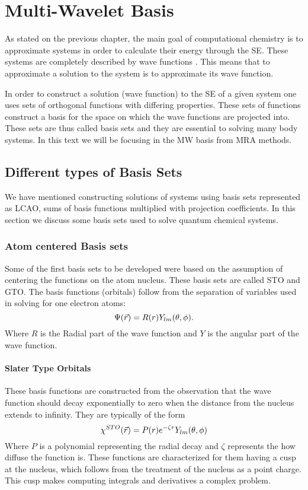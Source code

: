 \documentclass[../master_thesis.tex]{subfiles}
\begin{document}
\chapter{Multi-Wavelet Basis}
As stated on the previous chapter, the main goal of computational chemistry is
to approximate systems in order to calculate their energy through the \ac{SE}. %
These systems are completely described by wave functions \cite{Cohen:1973}.
This means that to approximate a solution to the system is to approximate its
wave function.

In order to construct a solution (wave function) to the \ac{SE} of a given
system one uses sets of orthogonal functions with differing properties. These
sets of functions construct a basis for the space on which the wave functions
are projected into. These sets are thus called basis sets \cite{Cramer:2004}
and they are essential to solving many body systems. In this text we will be
focusing in the \ac{MW} basis from \ac{MRA} methods.
\section{Different types of  Basis Sets}
We have mentioned constructing solutions of systems using basis sets represented as
\ac{LCAO}, sums of basis functions multiplied with projection coefficients.
In this section we discuss some basis sets used to solve quantum chemical systems.
\subsection{Atom centered Basis sets}
Some of the first basis sets to be developed were based on the assumption of
centering the functions on the atom nucleus. These basis sets are called \ac{STO}
and \ac{GTO}. The basis functions (orbitals) follow from the separation of variables
used in solving for one electron atoms:
\begin{equation}
  \Psi(\vec{r}) = R(r)Y_{lm}(\theta, \phi).
\end{equation}
Where $R$ is the Radial part of the wave function and $Y$ is the angular part of
the wave function.
\subsubsection{Slater Type Orbitals}
These basis functions are constructed from the observation that the wave function
should decay exponentially to zero when the distance from the nucleus extends
to infinity. They are typically of the form \cite{Jensen:2017, ESQCB1P1}
\begin{equation}
  \chi^{STO}(\vec{r}) = P(r)e^{-\zeta r}Y_{lm}(\theta, \phi)
\end{equation}
Where $P$ is a polynomial representing the radial decay and $\zeta$ represents the
how diffuse the function is. These functions are characterized for them having a cusp
at the nucleus, which follows from the treatment of the nucleus as a point charge.
This cusp makes computing integrals and derivatives a complex problem.
\end{document}
